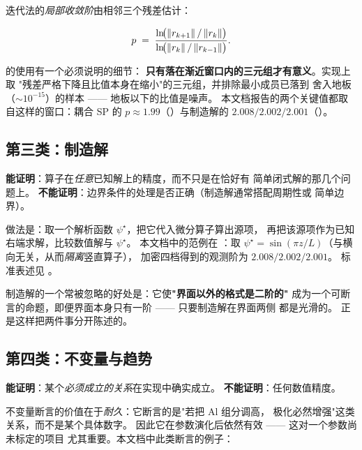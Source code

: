 迭代法的\emph{局部收敛阶}由相邻三个残差估计：

\begin{equation}
p \;=\;
\frac{\ln\!\bigl(\left\lVert r_{k+1} \right\rVert/\left\lVert r_k \right\rVert\bigr)}
     {\ln\!\bigl(\left\lVert r_k \right\rVert/\left\lVert r_{k-1} \right\rVert\bigr)} .
\label{eq:verify-local-order}
\end{equation}

 的使用有一个必须说明的细节：
\textbf{只有落在渐近窗口内的三元组才有意义}。实现上取
"残差严格下降且比值本身在缩小"的三元组，并排除最小成员已落到
舍入地板（$\sim10^{-15}$）的样本 —— 地板以下的比值是噪声。
本文档报告的两个关键值都取自这样的窗口：耦合 SP 的
$p\approx1.99$（）与制造解的
$2.008/2.002/2.001$（）。

\subsection{第三类：制造解}
\label{sec:verify-mms}

\textbf{能证明}：算子在\emph{任意}已知解上的精度，而不只是在恰好有
简单闭式解的那几个问题上。
\textbf{不能证明}：边界条件的处理是否正确（制造解通常搭配周期性或
简单边界）。

做法是：取一个解析函数 $\psi^{\star}$，把它代入微分算子算出源项，
再把该源项作为已知右端求解，比较数值解与 $\psi^{\star}$。
本文档中的范例在 ：取
$\psi^{\star}=\sin(\pi z/L)$（与横向无关，从而\emph{隔离}竖直算子），
加密四档得到的观测阶为 $2.008/2.002/2.001$。
标准表述见 \cite{roache2002,salari2000}。

制造解的一个常被忽略的好处是：它使\textbf{"界面以外的格式是二阶的"}
成为一个可断言的命题，即便界面本身只有一阶 —— 只要制造解在界面两侧
都是光滑的。 正是这样把两件事分开陈述的。

\subsection{第四类：不变量与趋势}
\label{sec:verify-invariants}

\textbf{能证明}：某个\emph{必须成立的关系}在实现中确实成立。
\textbf{不能证明}：任何数值精度。

不变量断言的价值在于\emph{耐久}：它断言的是"若把 Al 组分调高，
极化必然增强"这类关系，而不是某个具体数字。
因此它在参数演化后依然有效 —— 这对一个参数尚未标定的项目
尤其重要。本文档中此类断言的例子：

